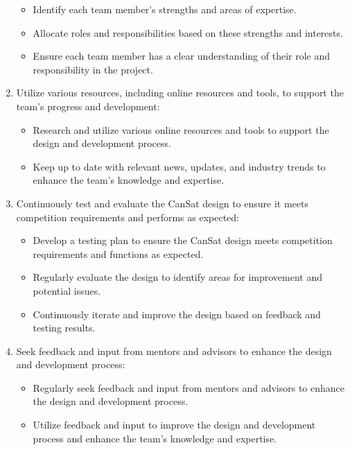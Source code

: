 \documentclass[11pt]{article}
\begin{document}
\begin{enumerate}[topsep=3pt]
\begin{itemize}[leftmargin=0.25cm,itemindent=0.5cm, noitemsep, topsep=2pt, label=]
        \item Identify each team member's strengths and areas of expertise.
        \item Allocate roles and responsibilities based on these strengths and interests.
        \item Ensure each team member has a clear understanding of their role and responsibility in the project.
    \end{itemize}
    \item Utilize various resources, including online resources and tools, to support the team's progress and development:
    \begin{itemize}[leftmargin=0.25cm,itemindent=0.5cm, noitemsep, topsep=2pt, label=]
        \item Research and utilize various online resources and tools to support the design and development process.
        \item Keep up to date with relevant news, updates, and industry trends to enhance the team's knowledge and expertise.
    \end{itemize}
    \item Continuously test and evaluate the CanSat design to ensure it meets competition requirements and performs as expected:
    \begin{itemize}[leftmargin=0.25cm,itemindent=0.5cm, noitemsep, topsep=2pt, label=]
        \item Develop a testing plan to ensure the CanSat design meets competition requirements and functions as expected.
        \item Regularly evaluate the design to identify areas for improvement and potential issues.
        \item Continuously iterate and improve the design based on feedback and testing results.
    \end{itemize}
    \item Seek feedback and input from mentors and advisors to enhance the design and development process:
    \begin{itemize}[leftmargin=0.25cm,itemindent=0.5cm, noitemsep, topsep=2pt, label=]
        \item Regularly seek feedback and input from mentors and advisors to enhance the design and development process.
        \item Utilize feedback and input to improve the design and development process and enhance the team's knowledge and expertise.
    \end{itemize}
\end{enumerate}
\end{document}

